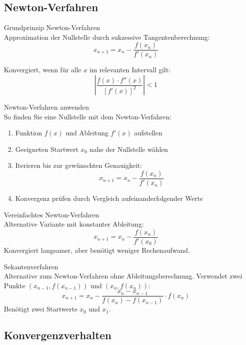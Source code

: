 \subsection{Newton-Verfahren}

\begin{concept}{Grundprinzip Newton-Verfahren}\\
Approximation der Nullstelle durch sukzessive Tangentenberechnung:
$$x_{n+1} = x_n - \frac{f(x_n)}{f'(x_n)}$$

Konvergiert, wenn für alle $x$ im relevanten Intervall gilt:
$$\left|\frac{f(x) \cdot f''(x)}{[f'(x)]^2}\right| < 1$$
\end{concept}

\begin{KR}{Newton-Verfahren anwenden}\\
So finden Sie eine Nullstelle mit dem Newton-Verfahren:
\begin{enumerate}
    \item Funktion $f(x)$ und Ableitung $f'(x)$ aufstellen
    \item Geeigneten Startwert $x_0$ nahe der Nullstelle wählen
    \item Iterieren bis zur gewünschten Genauigkeit:
    $$x_{n+1} = x_n - \frac{f(x_n)}{f'(x_n)}$$
    \item Konvergenz prüfen durch Vergleich aufeinanderfolgender Werte
\end{enumerate}
\end{KR}

\begin{theorem}{Vereinfachtes Newton-Verfahren}\\
Alternative Variante mit konstanter Ableitung:
$$x_{n+1} = x_n - \frac{f(x_n)}{f'(x_0)}$$
Konvergiert langsamer, aber benötigt weniger Rechenaufwand.
\end{theorem}

\begin{concept}{Sekantenverfahren}\\
Alternative zum Newton-Verfahren ohne Ableitungsberechnung. Verwendet zwei Punkte $(x_{n-1}, f(x_{n-1}))$ und $(x_n, f(x_n))$:
$$x_{n+1} = x_n - \frac{x_n-x_{n-1}}{f(x_n)-f(x_{n-1})} \cdot f(x_n)$$
Benötigt zwei Startwerte $x_0$ und $x_1$.
\end{concept}

\subsection{Konvergenzverhalten}

